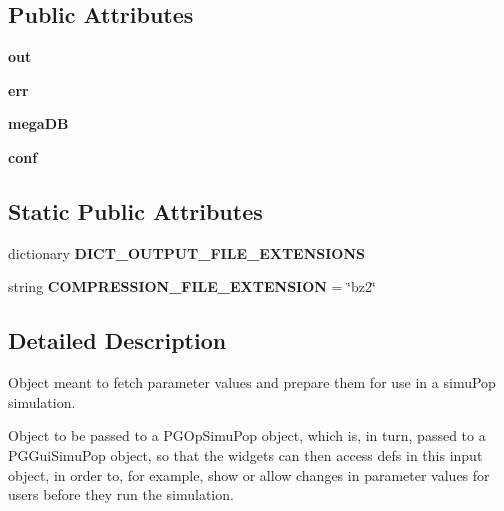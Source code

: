 \subsection*{Public Attributes}
\begin{DoxyCompactItemize}
\item 
{\bfseries out}\hypertarget{classnegui_1_1pgoutputsimupop_1_1PGOutputSimuPop_a4198008f7f7f029a29f8441ea7619170}{}\label{classnegui_1_1pgoutputsimupop_1_1PGOutputSimuPop_a4198008f7f7f029a29f8441ea7619170}

\item 
{\bfseries err}\hypertarget{classnegui_1_1pgoutputsimupop_1_1PGOutputSimuPop_a5eeccbf099cd8be3e8ab5906565d7b79}{}\label{classnegui_1_1pgoutputsimupop_1_1PGOutputSimuPop_a5eeccbf099cd8be3e8ab5906565d7b79}

\item 
{\bfseries mega\+DB}\hypertarget{classnegui_1_1pgoutputsimupop_1_1PGOutputSimuPop_a76379971c8aa1a3b175f171821b0b8f1}{}\label{classnegui_1_1pgoutputsimupop_1_1PGOutputSimuPop_a76379971c8aa1a3b175f171821b0b8f1}

\item 
{\bfseries conf}\hypertarget{classnegui_1_1pgoutputsimupop_1_1PGOutputSimuPop_ac6e385cca72ff0073251b511eea1103f}{}\label{classnegui_1_1pgoutputsimupop_1_1PGOutputSimuPop_ac6e385cca72ff0073251b511eea1103f}

\end{DoxyCompactItemize}
\subsection*{Static Public Attributes}
\begin{DoxyCompactItemize}
\item 
dictionary {\bfseries D\+I\+C\+T\+\_\+\+O\+U\+T\+P\+U\+T\+\_\+\+F\+I\+L\+E\+\_\+\+E\+X\+T\+E\+N\+S\+I\+O\+NS}
\item 
string {\bfseries C\+O\+M\+P\+R\+E\+S\+S\+I\+O\+N\+\_\+\+F\+I\+L\+E\+\_\+\+E\+X\+T\+E\+N\+S\+I\+ON} = \char`\"{}bz2\char`\"{}\hypertarget{classnegui_1_1pgoutputsimupop_1_1PGOutputSimuPop_aaf295d98adb01d86781790b5a57c5348}{}\label{classnegui_1_1pgoutputsimupop_1_1PGOutputSimuPop_aaf295d98adb01d86781790b5a57c5348}

\end{DoxyCompactItemize}


\subsection{Detailed Description}
\begin{DoxyVerb}Object meant to fetch parameter values and prepare them for 
use in a simuPop simulation.  

Object to be passed to a PGOpSimuPop object, which is, in turn,
passed to a PGGuiSimuPop object, so that the widgets can then access
defs in this input object, in order to, for example, show or allow
changes in parameter values for users before they run the simulation.
\end{DoxyVerb}
 

